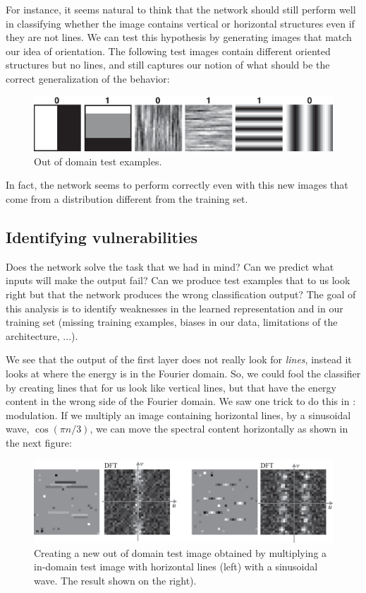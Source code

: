 For instance, it seems natural to think that the network should still perform well in classifying whether the image contains vertical or horizontal structures even if they are not lines. We can test this hypothesis by generating images that match our idea of orientation. The following test images contain different oriented structures but no lines, and still captures our notion of what should be the correct generalization of the behavior: 

\begin{figure}
\includegraphics[width=1\linewidth]{./figures/convolutional_neural_nets/oriented_bars_cnn_generalization.eps}
\caption{Out of domain test examples.}
\end{figure}

In fact, the network seems to perform correctly even with this new images that come from a distribution different from the training set. 

\subsection{Identifying vulnerabilities}

Does the network solve the task that we had in mind? Can we predict what inputs will make the output fail? Can we produce test examples that to us look right but that the network produces the wrong classification output? The goal of this analysis is to identify weaknesses in the learned representation and in our training set (missing training examples, biases in our data, limitations of the architecture, ...).

We see that the output of the first layer does not really look for {\em lines}, instead it looks at where the energy is in the Fourier domain. So, we could fool the classifier by creating lines that for us look like vertical lines, but that have the energy content in the wrong side of the Fourier domain. We saw one trick to do this in \chap{\ref{chapter:fourier_analysis}}: modulation. If we multiply an image containing horizontal lines, by a sinusoidal wave, $\cos (\pi n / 3)$, we can move the spectral content horizontally as shown in the next figure:

\begin{figure}
\includegraphics[width=1\linewidth]{./figures/convolutional_neural_nets/oriented_bars_cnn_test_adversarial_creation1.eps}
\caption{Creating a new out of domain test image obtained by multiplying a in-domain test image with horizontal lines (left) with a sinusoidal wave. The result shown on the right).}
\end{figure}

